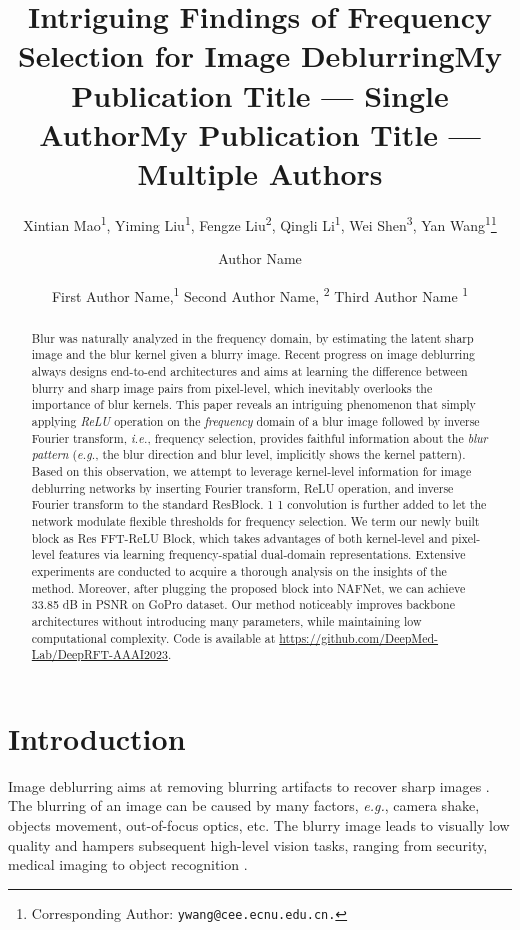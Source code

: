 \documentclass[letterpaper]{article} \usepackage{aaai23}  \usepackage{times}  \usepackage{helvet}  \usepackage{courier}  \usepackage[hyphens]{url}  \usepackage{graphicx} \usepackage{enumitem}
\title{Intriguing Findings of Frequency Selection for Image Deblurring}
\author{
Xintian Mao\textsuperscript{\rm 1}, Yiming Liu\textsuperscript{\rm 1}, Fengze Liu\textsuperscript{\rm 2}, Qingli Li\textsuperscript{\rm 1}, Wei Shen\textsuperscript{\rm 3}, Yan Wang\textsuperscript{\rm 1}\thanks{Corresponding Author: \tt ywang@cee.ecnu.edu.cn.}\\
}
\title{My Publication Title --- Single Author}
\author {
    Author Name
}
\title{My Publication Title --- Multiple Authors}
\author {
First Author Name,\textsuperscript{\rm 1}
    Second Author Name, \textsuperscript{\rm 2}
    Third Author Name \textsuperscript{\rm 1}
}
\begin{document}
\maketitle

\begin{abstract}
Blur was naturally analyzed in the frequency domain, by estimating the latent sharp image and the blur kernel given a blurry image. Recent progress on image deblurring always designs end-to-end architectures and aims at learning the difference between blurry and sharp image pairs from pixel-level, which inevitably overlooks the importance of blur kernels. This paper reveals an intriguing phenomenon that simply applying \emph{ReLU} operation on the \emph{frequency} domain of a blur image followed by inverse Fourier transform, \emph{i.e.}, frequency selection, provides faithful information about the \emph{blur pattern} (\emph{e.g.}, the blur direction and blur level, implicitly shows the kernel pattern). Based on this observation, we attempt to leverage kernel-level information for image deblurring networks by inserting Fourier transform, ReLU operation, and inverse Fourier transform to the standard ResBlock. 1  1 convolution is further added to let the network modulate flexible thresholds for frequency selection. We term our newly built block as {Res FFT-ReLU Block}, which takes advantages of both kernel-level and pixel-level features via learning frequency-spatial dual-domain representations. 
Extensive experiments are conducted to acquire a thorough analysis on the insights of the method. Moreover, after plugging the proposed block into NAFNet, we can achieve 33.85 dB in PSNR on GoPro dataset. Our method noticeably improves backbone architectures without introducing many parameters, while maintaining low computational complexity. Code is available at \url{https://github.com/DeepMed-Lab/DeepRFT-AAAI2023}.
\end{abstract}

\section{Introduction}
\label{sec:intro}
Image deblurring aims at removing blurring artifacts to recover sharp images \cite{Cho2021rethinking}. The blurring of an image can be caused by many factors, \textit{e.g.}, camera shake, objects movement, out-of-focus optics, etc. The blurry image leads to visually low quality and hampers subsequent high-level vision tasks, ranging from security, medical imaging to object recognition \cite{Chen2020one}. 
\end{document}

